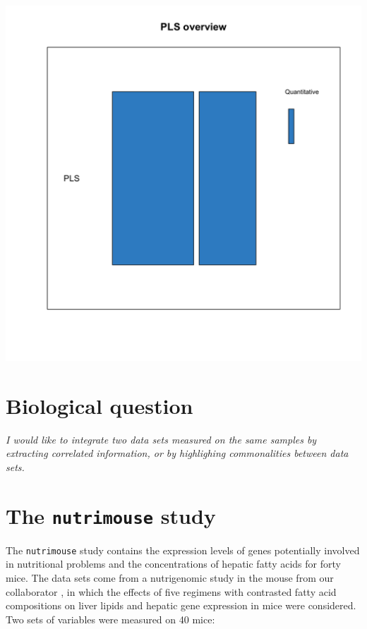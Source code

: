 \documentclass[]{book}
\begin{document}
\begin{center}\includegraphics[width=0.75\linewidth,]{Figures/05-overview-PLS-1} \end{center}

\hypertarget{biological-question-3}{%
\section{Biological question}\label{biological-question-3}}

{
\emph{I would like to integrate two data sets measured on the same samples by extracting correlated information, or by highlighing commonalities between data sets.}
}

\hypertarget{the-nutrimouse-study}{%
\section{\texorpdfstring{The \texttt{nutrimouse} study}{The nutrimouse study}}\label{the-nutrimouse-study}}

The \texttt{nutrimouse} study contains the expression levels of genes potentially involved in nutritional problems and the concentrations of hepatic fatty acids for forty mice. The data sets come from a nutrigenomic study in the mouse from our collaborator \citep{Mar07}, in which the effects of five regimens with contrasted fatty acid compositions on liver lipids and hepatic gene expression in mice were considered. Two sets of variables were measured on 40 mice:
\end{document}
